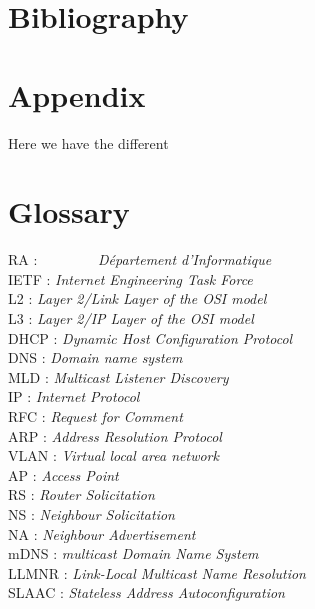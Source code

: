 \documentclass[a4paper,11pt]{article}
\begin{document}
 	\clearpage
 	\section{Bibliography}
		
		


	\clearpage
	\section{Appendix}
	 	Here we have the different


	\section{Glossary}
			\begin{tabbing}
	  		RA : ~~~~~~~~\= \textit{Département d'Informatique} \\
	 	 	IETF : \> \textit{Internet Engineering Task Force} \\
	  		L2 : \> \textit{Layer 2/Link Layer of the OSI model} \\
	  		L3 : \> \textit{Layer 2/IP Layer of the OSI model} \\
	 		DHCP : \> \textit{Dynamic Host Configuration Protocol} \\
	  		DNS : \> \textit{Domain name system} \\
	  		MLD : \> \textit{Multicast Listener Discovery} \\
	  		IP : \> \textit{Internet Protocol} \\
	  		RFC : \> \textit{Request for Comment} \\
	  		ARP : \> \textit{Address Resolution Protocol} \\
	  		VLAN : \> \textit{Virtual local area network} \\
	  		AP : \> \textit{Access Point} \\
	  		RS : \> \textit{Router Solicitation} \\
	  		NS : \> \textit{Neighbour Solicitation} \\
	  		NA : \> \textit{Neighbour Advertisement} \\
	  		mDNS : \> \textit{ multicast Domain Name System} \\
	  		LLMNR : \> \textit{ Link-Local Multicast Name Resolution} \\
	  		SLAAC : \> \textit{ Stateless Address Autoconfiguration} \\
			\end{tabbing}
				
				
				
\end{document}
